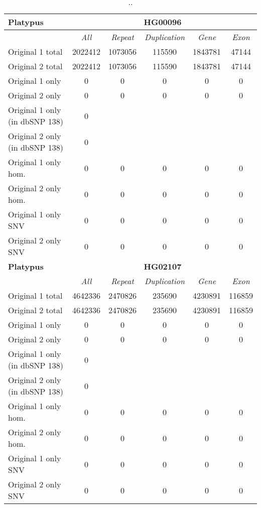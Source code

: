 \begin{table}[htb]
\begin{center}
\begin{tabular}{|l|c||c|c|c|c|}
\hline
{\bf Platypus} & \multicolumn{5}{|c|}{\bf HG00096} \\
\hline
\cline{2-6}
{\bf} & {\it All} & {\it Repeat} & {\it Duplication} & {\it Gene} & {\it Exon} \\
\hline
Original 1 total & 2022412 & 1073056 & 115590 & 1843781 & 47144\\ 
\hline
Original 2 total & 2022412 & 1073056 & 115590 & 1843781 & 47144\\ 
\hline
Original 1 only & 0 & 0 & 0 & 0 & 0\\ 
\hline
Original 2 only & 0 & 0 & 0 & 0 & 0\\ 
\hline
Original 1 only (in dbSNP 138) & 0 &  &  &  & \\ 
\hline
Original 2 only (in dbSNP 138) & 0 &  &  &  & \\ 
\hline
Original 1 only hom. & 0 & 0 & 0 & 0 & 0\\ 
\hline
Original 2 only hom. & 0 & 0 & 0 & 0 & 0\\ 
\hline
Original 1 only SNV & 0 & 0 & 0 & 0 & 0\\ 
\hline
Original 2 only SNV & 0 & 0 & 0 & 0 & 0\\ 
\hline
\hline
{\bf Platypus} & \multicolumn{5}{|c|}{\bf HG02107} \\
\hline
\cline{2-6}
{\bf} & {\it All} & {\it Repeat} & {\it Duplication} & {\it Gene} & {\it Exon} \\
\hline
Original 1 total & 4642336 & 2470826 & 235690 & 4230891 & 116859\\ 
\hline
Original 2 total & 4642336 & 2470826 & 235690 & 4230891 & 116859\\ 
\hline
Original 1 only & 0 & 0 & 0 & 0 & 0\\ 
\hline
Original 2 only & 0 & 0 & 0 & 0 & 0\\ 
\hline
Original 1 only (in dbSNP 138) & 0 &  &  &  & \\ 
\hline
Original 2 only (in dbSNP 138) & 0 &  &  &  & \\ 
\hline
Original 1 only hom. & 0 & 0 & 0 & 0 & 0\\ 
\hline
Original 2 only hom. & 0 & 0 & 0 & 0 & 0\\ 
\hline
Original 1 only SNV & 0 & 0 & 0 & 0 & 0\\ 
\hline
Original 2 only SNV & 0 & 0 & 0 & 0 & 0\\ 
\hline
\end{tabular}
\end{center}
\caption{ .. }
\label{tab:orig-vs-orig2-platypus}
\end{table}

